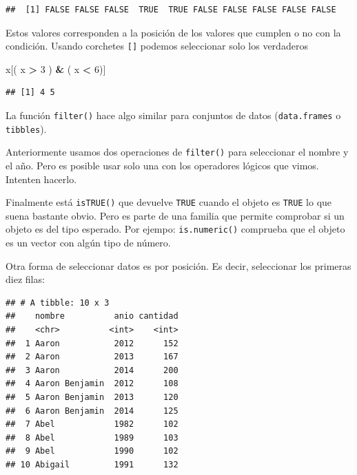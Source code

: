 \documentclass[]{book}
\newenvironment{Shaded}{\begin{snugshade}}{\end{snugshade}}
\newcommand{\DecValTok}[1]{\textcolor[rgb]{0.00,0.00,0.81}{#1}}
\newcommand{\KeywordTok}[1]{\textcolor[rgb]{0.13,0.29,0.53}{\textbf{#1}}}
\newcommand{\NormalTok}[1]{#1}
\newcommand{\OperatorTok}[1]{\textcolor[rgb]{0.81,0.36,0.00}{\textbf{#1}}}
\newcommand{\StringTok}[1]{\textcolor[rgb]{0.31,0.60,0.02}{#1}}
\theoremstyle{definition}
\theoremstyle{definition}
\theoremstyle{definition}
\theoremstyle{remark}
\let\BeginKnitrBlock\begin \let\EndKnitrBlock\end
\begin{document}
\begin{verbatim}
##  [1] FALSE FALSE FALSE  TRUE  TRUE FALSE FALSE FALSE FALSE FALSE
\end{verbatim}

Estos valores corresponden a la posición de los valores que cumplen o no
con la condición. Usando corchetes \texttt{{[}{]}} podemos seleccionar
solo los verdaderos

\begin{Shaded}
\begin{Highlighting}[]
\NormalTok{x[( x }\OperatorTok{>}\StringTok{ }\DecValTok{3}\NormalTok{ ) }\OperatorTok{&}\StringTok{ }\NormalTok{( x }\OperatorTok{<}\StringTok{ }\DecValTok{6}\NormalTok{)]}
\end{Highlighting}
\end{Shaded}

\begin{verbatim}
## [1] 4 5
\end{verbatim}

La función \texttt{filter()} hace algo similar para conjuntos de datos
(\texttt{data.frames} o \texttt{tibbles}).

\BeginKnitrBlock{exercise}
\protect\hypertarget{exr:ejercicio-7}{}{\label{exr:ejercicio-7}
}Anteriormente usamos dos operaciones de \texttt{filter()} para
seleccionar el nombre y el año. Pero es posible usar solo una con los
operadores lógicos que vimos. Intenten hacerlo.
\EndKnitrBlock{exercise}

Finalmente está \texttt{isTRUE()} que devuelve \texttt{TRUE} cuando el
objeto es \texttt{TRUE} lo que suena bastante obvio. Pero es parte de
una familia que permite comprobar si un objeto es del tipo esperado. Por
ejempo: \texttt{is.numeric()} comprueba que el objeto es un vector con
algún tipo de número.

Otra forma de seleccionar datos es por posición. Es decir, seleccionar
los primeras diez filas:

\begin{Shaded}
\end{Shaded}

\begin{verbatim}
## # A tibble: 10 x 3
##    nombre          anio cantidad
##    <chr>          <int>    <int>
##  1 Aaron           2012      152
##  2 Aaron           2013      167
##  3 Aaron           2014      200
##  4 Aaron Benjamin  2012      108
##  5 Aaron Benjamin  2013      120
##  6 Aaron Benjamin  2014      125
##  7 Abel            1982      102
##  8 Abel            1989      103
##  9 Abel            1990      102
## 10 Abigail         1991      132
\end{verbatim}
\end{document}
